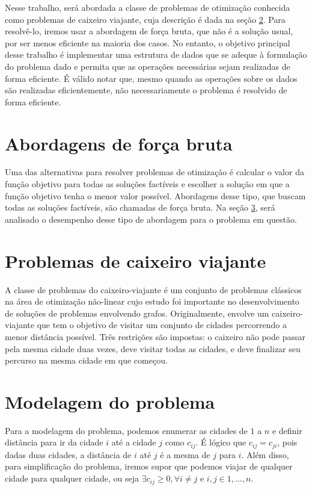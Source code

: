 \documentclass[a4paper, 12pt]{article} %
\begin{document}
	Nesse trabalho, será abordada a classe de problemas de otimização conhecida como problemas de caixeiro viajante, cuja descrição é dada na seção \ref{sec:description}. Para resolvê-lo, iremos usar a abordagem de força bruta, que não é a solução usual, por ser menos eficiente na maioria dos casos. No entanto, o objetivo principal desse trabalho é implementar uma estrutura de dados que se adeque à formulação do problema dado e permita que as operações necessárias sejam realizadas de forma eficiente. É válido notar que, mesmo quando as operações sobre os dados são realizadas eficientemente, não necessariamente o problema é resolvido de forma eficiente.
		
	\section{Abordagens de força bruta}
	
	Uma das alternativas para resolver problemas de otimização é calcular o valor da função objetivo para todas as soluções factíveis e escolher a solução em que a função objetivo tenha o menor valor possível. Abordagens desse tipo, que buscam todas as soluções factíveis, são chamadas de força bruta. Na seção \ref{sec:modelagem}, será analisado o desempenho desse tipo de abordagem para o problema em questão.

	\section{Problemas de caixeiro viajante} \label{sec:description}
	A classe de problemas do caixeiro-viajante é um conjunto de problemas clássicos na área de otimização não-linear cujo estudo foi importante no desenvolvimento de soluções de problemas envolvendo grafos. Originalmente, envolve um caixeiro-viajante que tem o objetivo de visitar um conjunto de cidades percorrendo a menor distância possível. Três restrições são impostas: o caixeiro não pode passar pela mesma cidade duas vezes, deve visitar todas as cidades, e deve finalizar seu percurso na mesma cidade em que começou.
	
	\section{Modelagem do problema} \label{sec:modelagem}
	Para a modelagem do problema, podemos enumerar as cidades de $1$ a $n$ e definir distância para ir da cidade $i$ até a cidade $j$ como $c_{ij}$. É lógico que $c_{ij} = c_{ji}$, pois dadas duas cidades, a distância de $i$ até $j$ é a mesma de $j$ para $i$. Além disso, para simplificação do problema, iremos supor que podemos viajar de qualquer cidade para qualquer cidade, ou seja $\exists c_{ij} \geq 0, \forall i \neq j$ e $i,j \in {1, ..., n}$.
	
\end{document}
